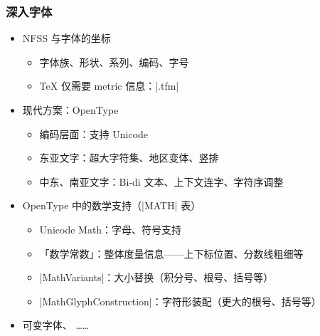 \begin{frame}[fragile]
\frametitle{深入字体}
\begin{itemize}
  \item<+-> NFSS 与字体的坐标

    \begin{itemize}
      \item 字体族、形状、系列、编码、字号
      \item \TeX{} 仅需要 metric 信息：|.tfm|
    \end{itemize}

  \item<+-> 现代方案：OpenType

    \begin{itemize}
      \item 编码层面：支持 Unicode
      \item 东亚文字：超大字符集、地区变体、竖排
      \item 中东、南亚文字：Bi-di 文本、上下文连字、字符序调整
    \end{itemize}

  \item<+-> OpenType 中的数学支持（|MATH| 表）

    \begin{itemize}
      \item Unicode Math：字母、符号支持
      \item 「数学常数」：整体度量信息——上下标位置、分数线粗细等
      \item |MathVariants|：大小替换（积分号、根号、括号等）
      \item |MathGlyphConstruction|：字符形装配（更大的根号、括号等）
    \end{itemize}

  \item<+-> 可变字体、
    ……
\end{itemize}
\end{frame}

